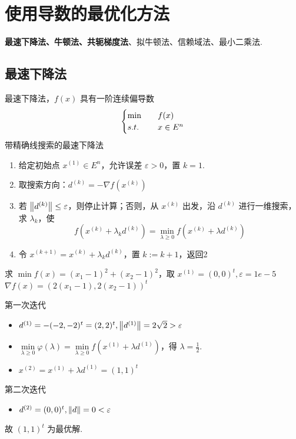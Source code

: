 \section{使用导数的最优化方法}
\textbf{最速下降法、牛顿法、共轭梯度法}、拟牛顿法、信赖域法、最小二乘法.

\subsection{最速下降法}
\begin{note}
    最速下降法，$f(x)$ 具有一阶连续偏导数 \[\begin{cases}
        \min \quad &f(x)\\
        s.t. \quad &x \in E^n
    \end{cases}\]
    带精确线搜索的最速下降法 \begin{enumerate}
        \item 给定初始点 $x^{(1)} \in E^n$，允许误差 $\varepsilon > 0$，置 $k = 1$.
        \item 取搜索方向：$d^{(k)} = -\nabla f(x^{(k)})$
        \item 若 $\norm{d^{(k)}} \le \varepsilon$，则停止计算；否则，从 $x^{(k)}$ 出发，沿 $d^{(k)}$ 进行一维搜索，求 $\lambda_k$，使 \[f(x^{(k)} + \lambda_k d^{(k)}) = \min_{\lambda \ge 0} f(x^{(k)} + \lambda d^{(k)})\]
        \item 令 $x^{(k + 1)} = x^{(k)} + \lambda_k d^{(k)}$，置 $k := k + 1$，返回2
    \end{enumerate}
\end{note}

\begin{example}
    求 $\min f(x) = (x_1 - 1)^2 + (x_2 - 1)^2$，取 $x^{(1)} = (0, 0)^t, \varepsilon = 1e-5$
    \answer $\nabla f(x) = (2(x_1 - 1), 2(x_2 - 1))^t$

    第一次迭代\begin{itemize}
        \item $d^{(1)} = -(-2, -2)^t = (2, 2)^t, \norm{d^{(1)}} = 2\sqrt{2} > \varepsilon$
        \item $\underset{\lambda \ge 0}{\min} \varphi(\lambda) = \underset{\lambda \ge 0}{\min} f(x^{(1)} + \lambda d^{(1)})$，得 $\lambda = \frac{1}{2}$.
        \item $x^{(2)} = x^{(1)} + \lambda d^{(1)} = (1, 1)^t$
    \end{itemize}
    第二次迭代\begin{itemize}
        \item $d^{(2)} = (0, 0)^t, \norm{d} = 0 < \varepsilon$
    \end{itemize}
    故 $(1, 1)^t$ 为最优解.
\end{example}

